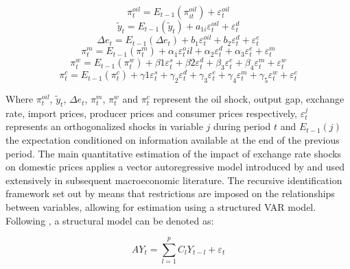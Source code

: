 \documentclass[12pt]{article}
\begin{document}
\begin{equation} \label{eq:supply}
    \pi^{oil}_{t} = E_{t-1}\left(\pi^{oil}_{it}\right) + \varepsilon^{oil}_{t}
\end{equation}
\begin{equation} \label{eq:demand}
    \tilde{y}_{t} = E_{t-1}\left(\tilde{y}_{t}\right) + a_{1i}\varepsilon^{oil}_{t} + \varepsilon^{d}_{t}
\end{equation}
\begin{equation} \label{eq:exrate}
    \Delta e_{t} = E_{t-1}\left(\Delta e_{t}\right) + b_{1}\varepsilon^{oil}_{t} + b_{2}\varepsilon^{d}_{t} + \varepsilon^{e}_{t}
\end{equation}
\begin{equation}\label{eq:importprices}
\pi_t^m = E_{t-1}(\pi_t^m) + \alpha_{1}\varepsilon_t^oil + \alpha_{2}\varepsilon_t^d + \alpha_{3}\varepsilon_t^e + \varepsilon_t^m
\end{equation}
\begin{equation}\label{eq:ppi}
\pi_t^w = E_{t-1}(\pi_t^w) + \beta{1}\varepsilon_t^s + \beta{2}\varepsilon_t^d + \beta_{3}\varepsilon_t^e + \beta_{4}\varepsilon_t^m + \varepsilon_t^w
\end{equation}
\begin{equation}\label{eq:cpi}
\pi_t^c = E_{t-1}(\pi_t^c) + \gamma{1}\varepsilon_t^s + \gamma_{2}\varepsilon_t^d + \gamma_{3}\varepsilon_t^e + \gamma_{4}\varepsilon_t^m + \gamma_{5}\varepsilon_t^w +\varepsilon_t^c
\end{equation}

Where $\pi^{oil}_{t}$, $\tilde{y}_{t}$, $\Delta e_{t}$, $\pi_t^m$, $\pi_t^w$ and $\pi_t^c$ represent the oil shock, output gap, exchange rate, import prices, producer prices and consumer prices respectively, $\varepsilon_t^j$ represents an orthogonalized shocks in variable $j$ during period $t$ and $E_{t-1}(j)$ the expectation conditioned on information available at the end of the previous period. The main quantitative estimation of the impact of exchange rate shocks on domestic prices applies a vector autoregressive model introduced by \textcite{sims1980} and used extensively in subsequent macroeconomic literature. The recursive identification framework set out by \textcite{mccarthy1999} means that restrictions are imposed on the relationships between variables, allowing for estimation using a structured VAR model. Following \textcite{sims1986forecasting}, a structural model can be denoted as:

\begin{equation}\label{eq:structural_form} AY_t =   \sum_{l=1}^{p} C_{l}Y_{t-l} +  \varepsilon_t \end{equation} 
\end{document}
